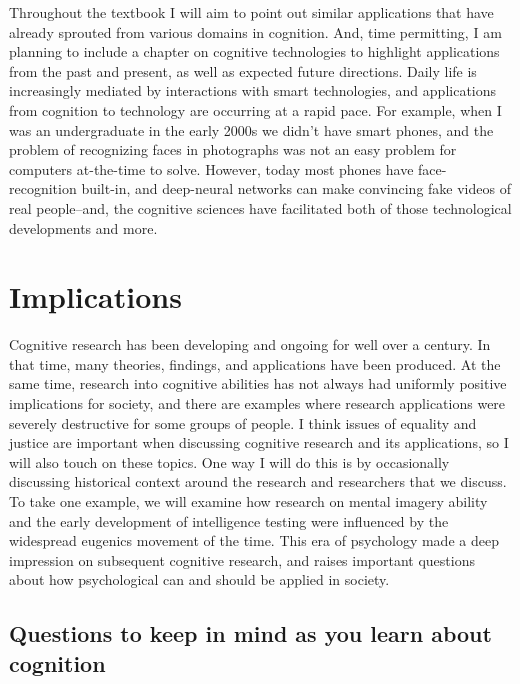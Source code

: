 \documentclass[
  oneside,
  12pt]{crumpbook}
\begin{document}
Throughout the textbook I will aim to point out similar applications that have already sprouted from various domains in cognition. And, time permitting, I am planning to include a chapter on cognitive technologies to highlight applications from the past and present, as well as expected future directions. Daily life is increasingly mediated by interactions with smart technologies, and applications from cognition to technology are occurring at a rapid pace. For example, when I was an undergraduate in the early 2000s we didn't have smart phones, and the problem of recognizing faces in photographs was not an easy problem for computers at-the-time to solve. However, today most phones have face-recognition built-in, and deep-neural networks can make convincing fake videos of real people--and, the cognitive sciences have facilitated both of those technological developments and more.

\hypertarget{implications}{%
\section{Implications}\label{implications}}

Cognitive research has been developing and ongoing for well over a century. In that time, many theories, findings, and applications have been produced. At the same time, research into cognitive abilities has not always had uniformly positive implications for society, and there are examples where research applications were severely destructive for some groups of people. I think issues of equality and justice are important when discussing cognitive research and its applications, so I will also touch on these topics. One way I will do this is by occasionally discussing historical context around the research and researchers that we discuss. To take one example, we will examine how research on mental imagery ability and the early development of intelligence testing were influenced by the widespread eugenics movement of the time. This era of psychology made a deep impression on subsequent cognitive research, and raises important questions about how psychological can and should be applied in society.

\hypertarget{questions-to-keep-in-mind-as-you-learn-about-cognition}{%
\subsection{Questions to keep in mind as you learn about cognition}\label{questions-to-keep-in-mind-as-you-learn-about-cognition}}
\end{document}
